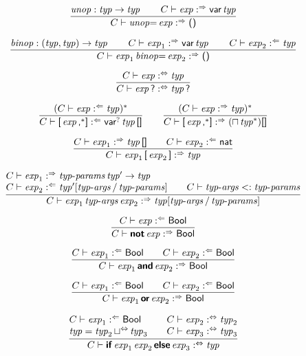 %
$$
\frac{
  \x{unop} : \x{typ} \Kto \x{typ}
  \qquad
  C \vdash \x{exp} \synth \K{var} \x{typ}
}{
  C \vdash \x{unop}{\!\K=} \x{exp} \synth \K{()}
}
$$

$$
\frac{
  \x{binop} : (\x{typ}, \x{typ}) \Kto \x{typ}
  \qquad
  C \vdash \x{exp}_1 \synth \K{var} \x{typ}
  \qquad
  C \vdash \x{exp}_2 \anal \x{typ}
}{
  C \vdash \x{exp}_1 \x{binop}{\!\K=} \x{exp}_2 \synth \K{()}
}
$$

$$
\frac{
  C \vdash \x{exp} \analsynth \x{typ}
}{
  C \vdash \x{exp} \K? \analsynth \x{typ} \K?
}
$$

$$
\frac{
  (C \vdash \x{exp} \anal \x{typ})^\ast
}{
  C \vdash \K[ \void{\KK{var}^?} \x{exp}\K,^\ast \K] \anal \K{var}^? \x{typ} \K{[]}
}
\qquad
\frac{
  (C \vdash \x{exp} \synth \x{typ})^\ast
}{
  C \vdash \K[ \void{\KK{var}^?} \x{exp}\K,^\ast \K] \synth \void{\K{var}^?} (\sqcap\x{typ}^\ast) \K{[]}
}
$$

$$
\frac{
  C \vdash \x{exp}_1 \synth \x{typ}\K{[]}
  \qquad
  C \vdash \x{exp}_2 \anal \K{nat}
}{
  C \vdash \x{exp}_1 \K[ \x{exp}_2 \K] \synth \x{typ}
}
$$

$$
\frac{
  \begin{array}[b]{@{}l@{}}
  C \vdash \x{exp}_1 \synth \x{typ-params} \x{typ}' \Kto \x{typ}
  \\
  C \vdash \x{exp}_2 \anal \x{typ}'[\x{typ-args} / \x{typ-params}]
  \end{array}
  \qquad
  \begin{array}{@{}l@{}}
  C \vdash \x{typ-args} \Ksub \x{typ-params}
  \end{array}
}{
  C \vdash \x{exp}_1 \x{typ-args} \x{exp}_2 \synth \x{typ}[\x{typ-args} / \x{typ-params}]
}
$$

$$
\frac{
  C \vdash \x{exp} \anal \K{Bool}
}{
  C \vdash \KK{not} \x{exp} \synth \K{Bool}
}
$$

$$
\frac{
  C \vdash \x{exp}_1 \anal \K{Bool}
  \qquad
  C \vdash \x{exp}_2 \anal \K{Bool}
}{
  C \vdash \x{exp}_1 \KK{and} \x{exp}_2 \synth \K{Bool}
}
$$

$$
\frac{
  C \vdash \x{exp}_1 \anal \K{Bool}
  \qquad
  C \vdash \x{exp}_2 \anal \K{Bool}
}{
  C \vdash \x{exp}_1 \KK{or} \x{exp}_2 \synth \K{Bool}
}
$$

$$
\frac{
  \begin{array}[b]{@{}l@{}}
  C \vdash \x{exp}_1 \anal \K{Bool}
  \\
  \x{typ} = \x{typ}_2 \joinanalsynth \x{typ}_3
  \end{array}
  \qquad
  \begin{array}[b]{@{}l@{}}
  C \vdash \x{exp}_2 \analsynth \x{typ}_2
  \\
  C \vdash \x{exp}_3 \analsynth \x{typ}_3
  \end{array}
}{
  C \vdash \KK{if} \x{exp}_1 \x{exp}_2 \KK{else} \x{exp}_3 \analsynth \x{typ}
}
$$

